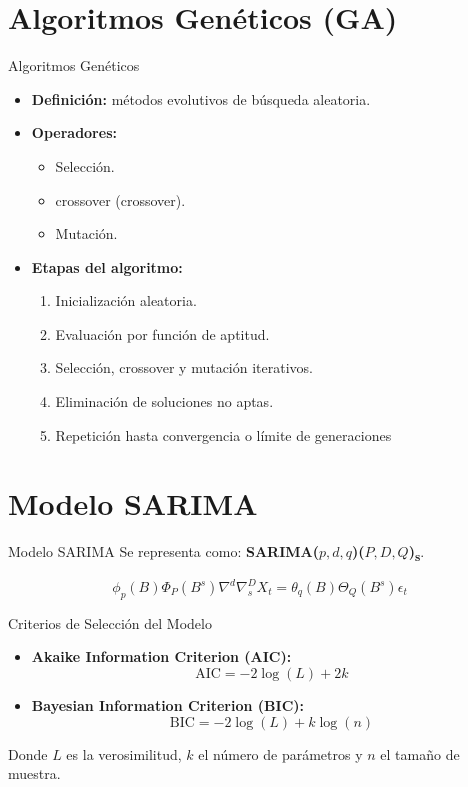 \documentclass[aspectratio=1610]{beamer}
\begin{document}
\section{Algoritmos Genéticos (GA)}
\begin{frame}{Algoritmos Genéticos}
\begin{itemize}
  \item \textbf{Definición:} métodos evolutivos de búsqueda aleatoria.
  \item \textbf{Operadores:}
  \begin{itemize}
    \item Selección.
    \item crossover (crossover).
    \item Mutación.
  \end{itemize}
  \item \textbf{Etapas del algoritmo:}
  \begin{enumerate}
    \item Inicialización aleatoria.
    \item Evaluación por función de aptitud.
    \item Selección, crossover y mutación iterativos.
    \item Eliminación de soluciones no aptas.
    \item Repetición hasta convergencia o límite de generaciones
  \end{enumerate}
\end{itemize}
\end{frame}


\section{Modelo SARIMA}
\begin{frame}{Modelo SARIMA}
    Se representa como: \textbf{SARIMA($p,d,q$)($P,D,Q$)\textsubscript{s}}.

  \begin{equation*}
    \phi_p(B) \Phi_P(B^s) \nabla^d \nabla^D_s X_t = \theta_q(B) \Theta_Q(B^s) \epsilon_t
  \end{equation*}
\end{frame}




\begin{frame}{Criterios de Selección del Modelo}
  \begin{itemize}
    \item \textbf{Akaike Information Criterion (AIC):}
      \[
        \text{AIC} = -2 \log(L) + 2k
      \]
    \item \textbf{Bayesian Information Criterion (BIC):}
      \[
        \text{BIC} = -2 \log(L) + k \log(n)
      \]
  \end{itemize}
  Donde $L$ es la verosimilitud, $k$ el número de parámetros y $n$ el tamaño de muestra.

\end{frame}
\end{document}
